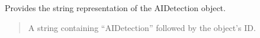 \documentclass[letterpaper,10pt,english]{sphinxmanual}
\begin{document}
\begin{fulllineitems}
\begin{fulllineitems}
\label{\detokenize{source/meta_models_management:id0}}
\pysigstartsignatures
{}
\pysigstopsignatures
\sphinxAtStartPar
Provides the string representation of the AIDetection object.
\begin{quote}\begin{description}
\sphinxAtStartPar
{} \textendash{} A string containing “AIDetection” followed by the object’s ID.

\end{description}\end{quote}

\end{fulllineitems}


\end{fulllineitems}

\end{document}
